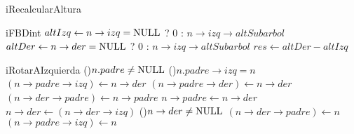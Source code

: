 \begin{Algoritmos}

  \begin{algoritmo}{iRecalcularAltura}{}{}
  \end{algoritmo}

  \begin{algoritmo}{iFBD}{}{int}
     $altIzq \gets n \to izq = \textrm{NULL}$ ? 0 : $n \to izq \to altSubarbol$ 
     $altDer \gets n \to der = \textrm{NULL}$ ? 0 : $n \to izq \to altSubarbol$ 
    $res \gets altDer - altIzq$ 
  \end{algoritmo}

  \begin{algoritmo}{iRotarAIzquierda}{}{}
    \If(){$n.padre \neq \textrm{NULL}$}{
      \eIf(){$n.padre \to izq = n$}{
        $(n \to padre \to izq) \gets n \to der$ 
      }{
        $(n \to padre \to der) \gets n \to der$ 
      }
    }
    $(n \to der \to padre) \gets n \to padre$  
    $n \to padre \gets n \to der$ 
    $n \to der \gets (n \to der \to izq)$ 
    \If(){$n \to der \neq \textrm{NULL}$}{
      $(n \to der \to padre) \gets n$ 
    }
    $(n \to padre \to izq) \gets n$ 
     
     
  \end{algoritmo}


\end{Algoritmos}
